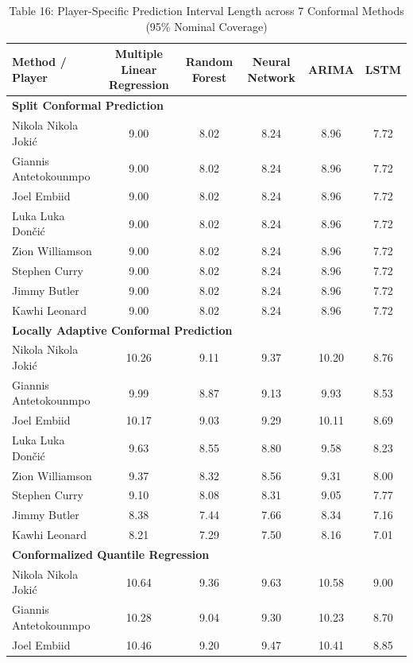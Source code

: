 \documentclass[11pt,a4paper]{article}
\begin{document}
\begin{table}[H]
\centering
\caption{Table 16: Player-Specific Prediction Interval Length across 7 Conformal Methods (95\% Nominal Coverage)}
\label{tab:star_len_95}
\scriptsize
\begin{tabular}{lccccc}
\toprule
Method / Player & Multiple Linear Regression & Random Forest & Neural Network & ARIMA & LSTM \\
\midrule
\multicolumn{6}{l}{\textbf{Split Conformal Prediction}} \\
\midrule
Nikola Nikola Joki\'{c} & 9.00 & 8.02 & 8.24 & 8.96 & 7.72 \\
Giannis Antetokounmpo & 9.00 & 8.02 & 8.24 & 8.96 & 7.72 \\
Joel Embiid & 9.00 & 8.02 & 8.24 & 8.96 & 7.72 \\
Luka Luka Don\v{c}i\'{c} & 9.00 & 8.02 & 8.24 & 8.96 & 7.72 \\
Zion Williamson & 9.00 & 8.02 & 8.24 & 8.96 & 7.72 \\
Stephen Curry & 9.00 & 8.02 & 8.24 & 8.96 & 7.72 \\
Jimmy Butler & 9.00 & 8.02 & 8.24 & 8.96 & 7.72 \\
Kawhi Leonard & 9.00 & 8.02 & 8.24 & 8.96 & 7.72 \\
\midrule
\multicolumn{6}{l}{\textbf{Locally Adaptive Conformal Prediction}} \\
\midrule
Nikola Nikola Joki\'{c} & 10.26 & 9.11 & 9.37 & 10.20 & 8.76 \\
Giannis Antetokounmpo & 9.99 & 8.87 & 9.13 & 9.93 & 8.53 \\
Joel Embiid & 10.17 & 9.03 & 9.29 & 10.11 & 8.69 \\
Luka Luka Don\v{c}i\'{c} & 9.63 & 8.55 & 8.80 & 9.58 & 8.23 \\
Zion Williamson & 9.37 & 8.32 & 8.56 & 9.31 & 8.00 \\
Stephen Curry & 9.10 & 8.08 & 8.31 & 9.05 & 7.77 \\
Jimmy Butler & 8.38 & 7.44 & 7.66 & 8.34 & 7.16 \\
Kawhi Leonard & 8.21 & 7.29 & 7.50 & 8.16 & 7.01 \\
\midrule
\multicolumn{6}{l}{\textbf{Conformalized Quantile Regression}} \\
\midrule
Nikola Nikola Joki\'{c} & 10.64 & 9.36 & 9.63 & 10.58 & 9.00 \\
Giannis Antetokounmpo & 10.28 & 9.04 & 9.30 & 10.23 & 8.70 \\
Joel Embiid & 10.46 & 9.20 & 9.47 & 10.41 & 8.85 \\

\end{tabular}
\end{table}
\end{document}
